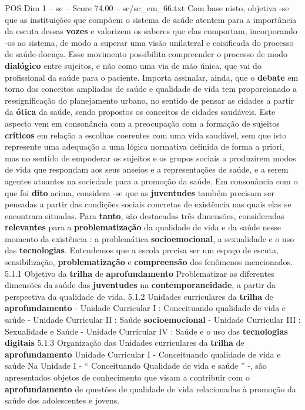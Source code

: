 \begin{textsample}{POS Dim 1 – sc – Score 74.00 – sc/sc\_em\_66.txt}
Com base nisto, objetiva -se que as instituições que compõem o sistema de saúde atentem para a importância da escuta dessas \textbf{vozes} e valorizem os saberes que elas comportam, incorporando -os ao sistema, de modo a superar uma visão unilateral e coisificada do processo de saúde-doença.
Esse movimento possibilita compreender o processo de modo \textbf{dialógico} entre sujeitos, e não como uma via de mão única, que vai do profissional da saúde para o paciente.
Importa assinalar, ainda, que o \textbf{debate} em torno dos conceitos ampliados de saúde e qualidade de vida tem proporcionado a ressignificação do planejamento urbano, no sentido de pensar as cidades a partir da \textbf{ótica} da saúde, sendo propostos os conceitos de cidades saudáveis.
Este aspecto vem em consonância com a preocupação com a formação de sujeitos \textbf{críticos} em relação a escolhas coerentes com uma vida saudável, sem que isto represente uma adequação a uma lógica normativa definida de forma a priori, mas no sentido de empoderar os sujeitos e os grupos sociais a produzirem modos de vida que respondam aos seus anseios e a representações de saúde, e a serem agentes atuantes na sociedade para a promoção da saúde.
Em consonância com o que foi \textbf{dito} acima, considera -se que as \textbf{juventudes} também precisam ser pensadas a partir das condições sociais concretas de existência nas quais elas se encontram situadas.
Para \textbf{tanto}, são destacadas três dimensões, consideradas \textbf{relevantes} para a \textbf{problematização} da qualidade de vida e da saúde nesse momento da existência : a problemática \textbf{socioemocional}, a sexualidade e o uso das \textbf{tecnologias}.
Entendemos que a escola precisa ser um espaço de escuta, sensibilização, \textbf{problematização} e \textbf{compreensão} dos fenômenos mencionados. 5.1.1 Objetivo da \textbf{trilha} de \textbf{aprofundamento} Problematizar as diferentes dimensões da saúde das \textbf{juventudes} na \textbf{contemporaneidade}, a partir da perspectiva da qualidade de vida. 5.1.2 Unidades curriculares da \textbf{trilha} de \textbf{aprofundamento} - Unidade Curricular I : Conceituando qualidade de vida e saúde - Unidade Curricular II : Saúde \textbf{socioemocional} - Unidade Curricular III : Sexualidade e Saúde - Unidade Curricular IV : Saúde e o uso das \textbf{tecnologias} \textbf{digitais} 5.1.3 Organização das Unidades curriculares da \textbf{trilha} de \textbf{aprofundamento} Unidade Curricular I - Conceituando qualidade de vida e saúde Na Unidade I - “ Conceituando Qualidade de vida e saúde ” -, são apresentados objetos de conhecimento que visam a contribuir com o \textbf{aprofundamento} de questões de qualidade de vida relacionadas à promoção da saúde dos adolescentes e jovens.

\end{textsample}

